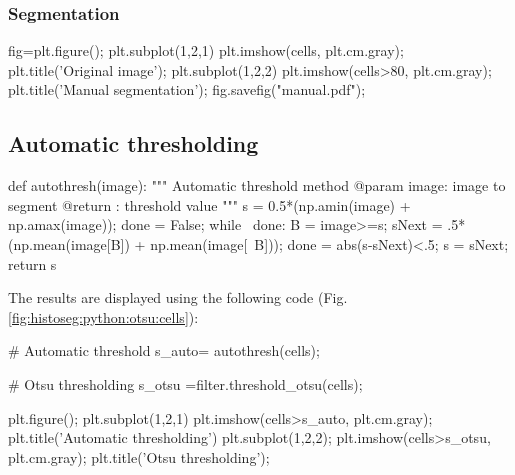 \subsubsection{Segmentation}
\begin{python}
fig=plt.figure();
plt.subplot(1,2,1)
plt.imshow(cells, plt.cm.gray); plt.title('Original image');
plt.subplot(1,2,2)
plt.imshow(cells>80, plt.cm.gray); plt.title('Manual segmentation');
fig.savefig("manual.pdf");
\end{python}

\subsection{Automatic thresholding}
\begin{python}
def autothresh(image):
    """ Automatic threshold method
    @param image: image to segment
    @return : threshold value
    """
    s = 0.5*(np.amin(image) + np.amax(image));
    done = False;
    while ~done:
        B = image>=s;
        sNext = .5*(np.mean(image[B]) + np.mean(image[~B]));
        done = abs(s-sNext)<.5;
        s = sNext;
    return s
\end{python}

The results are displayed using the following code (Fig. \ref{fig:histoseg:python:otsu:cells}):
\begin{python}
# Automatic threshold
s_auto= autothresh(cells);

# Otsu thresholding
s_otsu =filter.threshold_otsu(cells);

plt.figure();
plt.subplot(1,2,1)
plt.imshow(cells>s_auto, plt.cm.gray); plt.title('Automatic thresholding')
plt.subplot(1,2,2);
plt.imshow(cells>s_otsu, plt.cm.gray); plt.title('Otsu thresholding');
\end{python}

